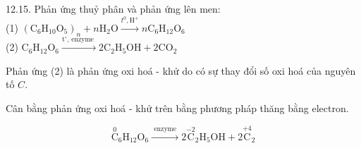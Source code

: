 \documentclass[10pt]{article}
\begin{document}
12.15. Phản ứng thuỷ phân và phản ứng lên men:\\
(1) $\left(\mathrm{C}_{6} \mathrm{H}_{10} \mathrm{O}_{5}\right)_{n}+n \mathrm{H}_{2} \mathrm{O} \xrightarrow{t^{0}, \mathrm{H}^{+}} n \mathrm{C}_{6} \mathrm{H}_{12} \mathrm{O}_{6}$\\
(2) $\mathrm{C}_{6} \mathrm{H}_{12} \mathrm{O}_{6} \xrightarrow{\mathrm{t}^{\circ} \text {, enzyme }} 2 \mathrm{C}_{2} \mathrm{H}_{5} \mathrm{OH}+2 \mathrm{CO}_{2}$

Phản ứng (2) là phản ứng oxi hoá - khử do có sự thay đổi số oxi hoá của nguyên tố $C$.

Cân bằng phản ứng oxi hoá - khử trên bằng phương pháp thăng bằng electron.

$$
\stackrel{0}{\mathrm{C}}_{6} \mathrm{H}_{12} \mathrm{O}_{6} \xrightarrow{\text { enzyme }} 2 \stackrel{-2}{\mathrm{C}}_{2} \mathrm{H}_{5} \mathrm{OH}+2 \stackrel{+4}{\mathrm{C}}_{2}
$$
\end{document}
